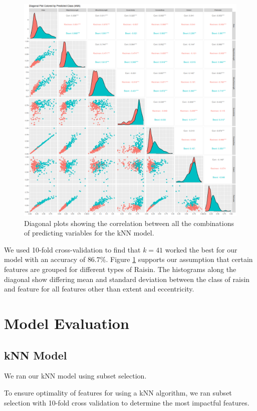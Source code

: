 \documentclass{article}
\begin{document}
\begin{figure}[h]
    \centering
    \includegraphics[width=1\linewidth]{knn_pairs_plot}
    \caption{Diagonal plots showing the correlation between all the combinations of predicting variables for the kNN model.}
    \label{fig:diagPlot}
\end{figure}

We used 10-fold cross-validation to find that $k = 41$ worked the best for our model with an accuracy of $86.7\%$. Figure \ref{fig:diagPlot} supports our assumption that certain features are grouped for different types of Raisin. The histograms along the diagonal show differing mean and standard deviation between the class of raisin and feature for all features other than extent and eccentricity. 


\clearpage

\section*{Model Evaluation}

\subsection*{kNN Model}
We ran our kNN model using subset selection.

To ensure optimality of features for using a kNN algorithm, we ran subset selection with 10-fold cross validation to determine the most impactful features.
\end{document}
